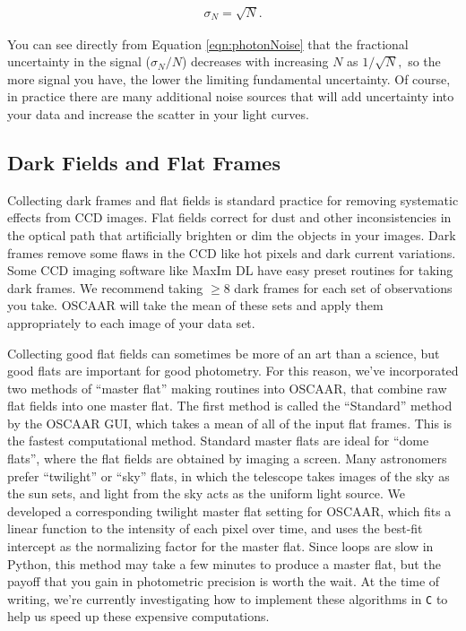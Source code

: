 \documentclass[a4paper]{article}
\newcommand{\code}[1]{\texttt{#1}}
\begin{document}
\begin{eqnarray}
\sigma_N = \sqrt{N}. \label{eqn:photonNoise}
\end{eqnarray}

\noindent You can see directly from Equation \ref{eqn:photonNoise} that the fractional uncertainty in the signal ($\sigma_N/N$) decreases with increasing $N$ as $1/\sqrt{N},$
so the more signal you have, the lower the limiting fundamental uncertainty. Of course, in practice there are many additional noise sources that will add uncertainty into your data and increase the scatter in your light curves. 
 
\subsection{Dark Fields and Flat Frames}

Collecting dark frames and flat fields is standard practice for removing systematic effects from CCD images. Flat fields correct for dust and other inconsistencies in the optical path that artificially brighten or dim the objects in your images. Dark frames remove some flaws in the CCD like hot pixels and dark current variations. Some CCD imaging software like MaxIm DL have easy preset routines for taking dark frames.  We recommend taking $\ge8$ dark frames for each set of observations you take. OSCAAR will take the mean of these sets and apply them appropriately to each image of your data set. 

Collecting good flat fields can sometimes be more of an art than a science, but good flats are important for good photometry. For this reason, we've incorporated two methods of ``master flat'' making routines into OSCAAR, that combine raw flat fields into one master flat. The first method is called the ``Standard'' method by the OSCAAR GUI, which takes a mean of all of the input flat frames. This is the fastest computational method. Standard master flats are ideal for ``dome flats'', where the flat fields are obtained by imaging a screen. Many astronomers prefer ``twilight'' or ``sky'' flats, in which the telescope takes images of the sky as the sun sets, and light from the sky acts as the uniform light source. We developed a corresponding twilight master flat setting for OSCAAR, which fits a linear function to the intensity of each pixel over time, and uses the best-fit intercept as the normalizing factor for the master flat. Since loops are slow in Python, this method may take a few minutes to produce a master flat, but the payoff that you gain in photometric precision is worth the wait. At the time of writing, we're currently investigating how to implement these algorithms in \code{C} to help us speed up these expensive computations.
\end{document}
